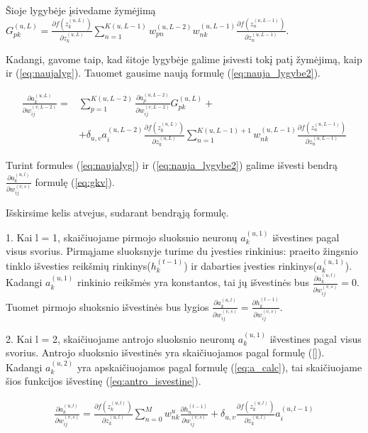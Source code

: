 Šioje lygybėje įsivedame žymėjimą $G_{pk}^{(u,L)} =
\frac{\partial f(z_k^{(u, L)})}{\partial z_k^{(u,L)}}
\sum_{n=1}^{K(u, L-1)} w_{pn}^{(u,L-2)} w_{nk}^{(u,L-1)} \frac{\partial f(z_n^{(u, L-1)})}{\partial z_n^{(u,L-1)}}$.

Kadangi, gavome taip, kad šitoje lygybėje galime įsivesti tokį patį žymėjimą, kaip ir (\ref{eq:naujalyg}). Tauomet gausime naują formulę (\ref{eq:nauja_lygybe2}).


\begin{equation}\label{eq:nauja_lygybe2}
  \begin{aligned}
    \frac{\partial a_k^{(u, L)}}{\partial w_{ij}^{(v,L-2)}} = &
      \sum_{p=1}^{K(u,L-2)}\frac{\partial a_p^{(u,L-2)}}{\partial w_{ij}^{(v,L-2)}}G_{pk}^{(u,L)} +\\
      &+ \delta_{u,v}a_i^{(u,L-2)}\frac{\partial f(z_k^{(u,L)})}{\partial z_k^{(u,L)}} \sum_{n=1}^{K(u,L-1)+1} w_{nk}^{(u,L-1)} \frac{\partial f(z_n^{(u,L-1)})}{\partial z_n^{(u,L-1)}}
  \end{aligned}
\end{equation}

Turint formules (\ref{eq:naujalyg}) ir (\ref{eq:nauja_lygybe2}) galime išvesti bendrą $\frac{\partial a_k^{(u, l)}}{\partial w_{ij}^{(v,s)}}$ formulę (\ref{eq:gkv}).

Išskirsime kelis atvejus, sudarant bendrąją formulę.

1. Kai l = 1, skaičiuojame pirmojo sluoksnio neuronų $a_k^{(u,1)}$ išvestines pagal visus svorius. Pirmąjame sluoksnyje turime du įvesties rinkinius: praeito žingsnio tinklo išvesties reikšmių rinkinys($h_k^{(t-1)}$) ir dabarties įvesties rinkinys($a_k^{(u,1)}$). Kadangi $a_k^{(u,1)}$ rinkinio reikšmės yra konstantos, tai jų išvestinės bus $\frac{\partial a_k^{(u, l)}}{\partial w_{ij}^{(v,s)}}=0$. Tuomet pirmojo sluoksnio išvestinės bus lygios $\frac{\partial a_k^{(u, l)}}{\partial w_{ij}^{(v,s)}} = \frac{\partial h_k^{(t-1)}}{\partial w_{ij}^{(v,s)}}$.

2. Kai l = 2, skaičiuojame antrojo sluoksnio neuronų $a_k^{(u,1)}$ išvestines pagal visus svorius. Antrojo sluoksnio išvestinės yra skaičiuojamos pagal formulę (\ref{}).
Kadangi $a_k^{(u,2)}$ yra apskaičiuojamos pagal formulę (\ref{eq:a_calc}), tai skaičiuojame šios funkcijos išvestinę (\ref{eq:antro_isvestine}).

\begin{equation}\label{eq:antro_isvestine}
  \begin{aligned}
    \frac{\partial a_k^{(u, l)}}{\partial w_{ij}^{(v,s)}} = \frac{\partial f(z_k^{(u,l)})}{\partial z_k^{(u,l)}}\sum_{n=0}^M w_{nk}^u \frac{\partial h_n^{(t-1)}}{\partial w_{ij}^{(v,s)}} +
    \delta_{u,v}\frac{\partial f(z_k^{(u,l)})}{\partial z_k^{(u,l)}}a_i^{(u,l-1)}
  \end{aligned}
\end{equation}


